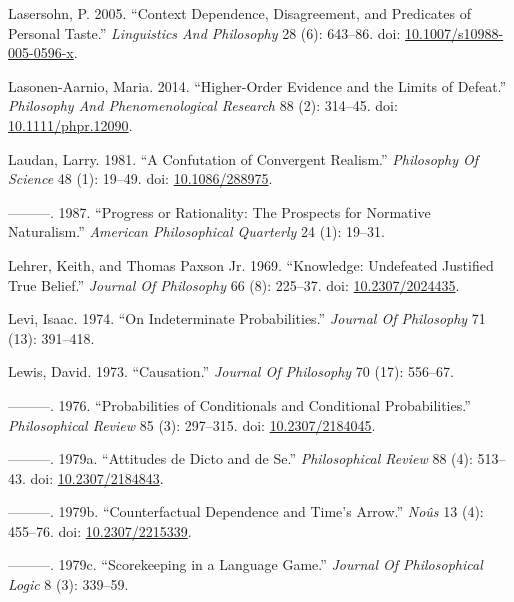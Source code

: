 \documentclass[
  10pt,
  letterpaper,
  DIV=11,
  numbers=noendperiod,
  twoside]{scrartcl}
\newlength{\cslhangindent}
\newenvironment{CSLReferences}[2] %
 {\begin{list}{}{%
  \setlength{\itemindent}{0pt}
  \setlength{\leftmargin}{0pt}
  \setlength{\parsep}{0pt}
  \ifodd #1
   \setlength{\leftmargin}{\cslhangindent}
   \setlength{\itemindent}{-1\cslhangindent}
  \fi
  \setlength{\itemsep}{#2\baselineskip}}}
 {\end{list}}
\begin{document}
\begin{CSLReferences}{1}{0}
Lasersohn, P. 2005. {``Context Dependence, Disagreement, and Predicates
of Personal Taste.''} \emph{Linguistics And Philosophy} 28 (6): 643--86.
doi:
\href{https://doi.org/10.1007/s10988-005-0596-x}{10.1007/s10988-005-0596-x}.

Lasonen-Aarnio, Maria. 2014. {``Higher-Order Evidence and the Limits of
Defeat.''} \emph{Philosophy And Phenomenological Research} 88 (2):
314--45. doi:
\href{https://doi.org/10.1111/phpr.12090}{10.1111/phpr.12090}.

Laudan, Larry. 1981. {``A Confutation of Convergent Realism.''}
\emph{Philosophy Of Science} 48 (1): 19--49. doi:
\href{https://doi.org/10.1086/288975}{10.1086/288975}.

---------. 1987. {``Progress or Rationality: The Prospects for Normative
Naturalism.''} \emph{American Philosophical Quarterly} 24 (1): 19--31.

Lehrer, Keith, and Thomas Paxson Jr. 1969. {``Knowledge: Undefeated
Justified True Belief.''} \emph{Journal Of Philosophy} 66 (8): 225--37.
doi: \href{https://doi.org/10.2307/2024435}{10.2307/2024435}.

Levi, Isaac. 1974. {``On Indeterminate Probabilities.''} \emph{Journal
Of Philosophy} 71 (13): 391--418.

Lewis, David. 1973. {``Causation.''} \emph{Journal Of Philosophy} 70
(17): 556--67.

---------. 1976. {``Probabilities of Conditionals and Conditional
Probabilities.''} \emph{Philosophical Review} 85 (3): 297--315. doi:
\href{https://doi.org/10.2307/2184045}{10.2307/2184045}.

---------. 1979a. {``Attitudes de Dicto and de Se.''}
\emph{Philosophical Review} 88 (4): 513--43. doi:
\href{https://doi.org/10.2307/2184843}{10.2307/2184843}.

---------. 1979b. {``Counterfactual Dependence and Time's Arrow.''}
\emph{Noûs} 13 (4): 455--76. doi:
\href{https://doi.org/10.2307/2215339}{10.2307/2215339}.

---------. 1979c. {``Scorekeeping in a Language Game.''} \emph{Journal
Of Philosophical Logic} 8 (3): 339--59.


\end{CSLReferences}
\end{document}
